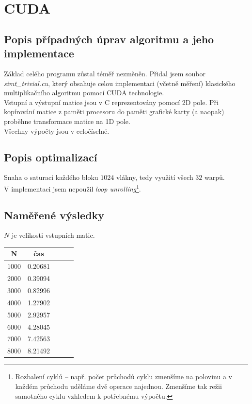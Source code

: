 \documentclass[12pt,a4paper]{article}
\begin{document}
\section{CUDA}
\subsection{Popis případných úprav algoritmu a jeho implementace}

Základ celého programu zůstal téměř nezměněn. Přidal jsem soubor \textit{simt\_trivial.cu}, který obsahuje celou implementaci (včetně měření) klasického multiplikačního algoritmu pomocí CUDA technologie. \\

Vstupní a výstupní matice jsou v C reprezentovány pomocí 2D pole. Při kopírování matice z paměti procesoru do paměti grafické karty (a naopak) proběhne transformace matice na 1D pole. \\

Všechny výpočty jsou v celočíselné.


\subsection{Popis optimalizací}

Snaha o saturaci každého bloku $1024$ vlákny, tedy využití všech $32$ warpů. \\

V implementaci jsem nepoužil \textit{loop unrolling}\footnote{Rozbalení cyklů -- např. počet průchodů cyklu zmenšíme na polovinu a v každém průchodu uděláme dvě operace najednou. Zmenšíme tak režii samotného cyklu vzhledem k potřebnému výpočtu.}.


\subsection{Naměřené výsledky}

$N$ je velikosti vstupních matic.

\begin{center}
\begin{tabular}{ | c || c | c | c | c | }
\hline
N    &   čas	\\
\hline
\hline
1000    &   0.20681 	\\ \hline
2000    &   0.39094 	\\ \hline
3000    &   0.82996 	\\ \hline
4000    &   1.27902 	\\ \hline
5000    &   2.92957 	\\ \hline
6000    &   4.28045 	\\ \hline
7000    &   7.42563 	\\ \hline
8000    &   8.21492 	\\ \hline
\end{tabular}
\end{center}
\end{document}
